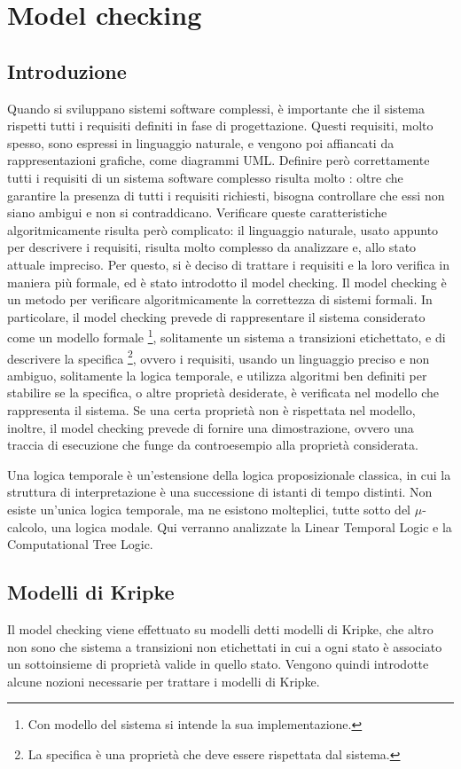 \chapter{Model checking}
\section{Introduzione}
Quando si sviluppano sistemi software complessi, è importante che il sistema
rispetti tutti i requisiti definiti in fase di progettazione.
Questi requisiti, molto spesso, sono espressi in linguaggio naturale, e vengono
poi affiancati da rappresentazioni grafiche, come diagrammi UML.
Definire però correttamente tutti i requisiti di un sistema software
complesso risulta molto
: oltre che garantire la presenza di tutti i requisiti richiesti, bisogna
controllare che essi non siano ambigui e non si contraddicano.
Verificare queste caratteristiche algoritmicamente risulta però complicato:
il linguaggio naturale, usato appunto per descrivere i requisiti, risulta
molto complesso da analizzare e, allo stato attuale impreciso.
Per questo, si è deciso di trattare i requisiti e la loro verifica in
maniera più formale, ed è stato introdotto il model checking.
Il model checking è un metodo per verificare algoritmicamente la correttezza di
sistemi formali. In particolare, il model checking prevede di rappresentare
il sistema considerato come un modello formale \footnote{Con
modello del sistema si intende la sua implementazione.},
solitamente un sistema a transizioni etichettato, e di descrivere la specifica
\footnote{La specifica è una proprietà che deve essere rispettata dal sistema.},
ovvero i requisiti, usando un linguaggio preciso e non ambiguo, solitamente
la logica temporale, e utilizza algoritmi ben definiti per stabilire
se la specifica, o altre proprietà desiderate, è verificata nel modello
che rappresenta il sistema. Se una certa proprietà non è rispettata nel modello,
inoltre, il model checking prevede di fornire una dimostrazione, ovvero una
traccia di esecuzione che funge da controesempio alla proprietà considerata.

Una logica temporale è un'estensione della logica proposizionale classica,
in cui la struttura di interpretazione è una successione di istanti di tempo
distinti.
Non esiste un'unica logica temporale, ma ne esistono molteplici, tutte
sotto del $\mu$-calcolo, una logica modale.
Qui verranno analizzate la Linear Temporal Logic e la Computational Tree
Logic.


\section{Modelli di Kripke}
Il model checking viene effettuato su modelli detti modelli di Kripke,
che altro non sono che sistema a transizioni non etichettati in cui
a ogni stato è associato un sottoinsieme di proprietà valide in quello stato.
Vengono quindi introdotte alcune nozioni necessarie per trattare i modelli di
Kripke.

